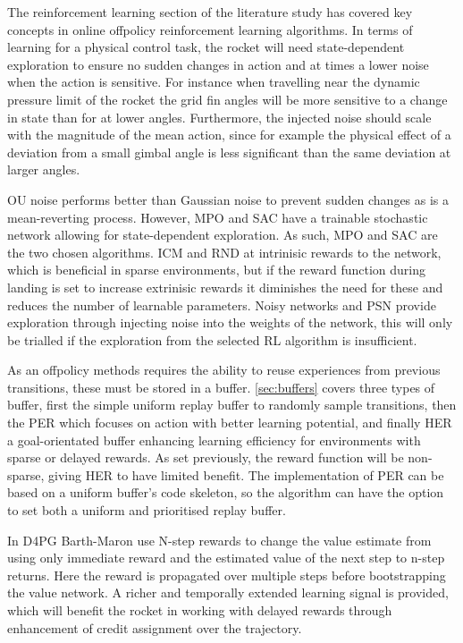 The reinforcement learning section of the literature study has covered key concepts in online offpolicy reinforcement learning algorithms. In terms of learning for a physical control task, the rocket will need state-dependent exploration to ensure no sudden changes in action and at times a lower noise when the action is sensitive. For instance when travelling near the dynamic pressure limit of the rocket the grid fin angles will be more sensitive to a change in state than for at lower angles. Furthermore, the injected noise should scale with the magnitude of the mean action, since for example the physical effect of a deviation from a small gimbal angle is less significant than the same deviation at larger angles.

OU noise performs better than Gaussian noise to prevent sudden changes as is a mean-reverting process. However, MPO and SAC have a trainable stochastic network allowing for state-dependent exploration. As such, MPO and SAC are the two chosen algorithms. ICM and RND at intrinisic rewards to the network, which is beneficial in sparse environments, but if the reward function during landing is set to increase extrinisic rewards it diminishes the need for these and reduces the number of learnable parameters. Noisy networks and PSN provide exploration through injecting noise into the weights of the network, this will only be trialled if the exploration from the selected RL algorithm is insufficient.

As an offpolicy methods requires the ability to reuse experiences from previous transitions, these must be stored in a buffer. \autoref{sec:buffers} covers three types of buffer, first the simple uniform replay buffer to randomly sample transitions, then the PER which focuses on action with better learning potential, and finally HER a goal-orientated buffer enhancing learning efficiency for environments with sparse or delayed rewards. As set previously, the reward function will be non-sparse, giving HER to have limited benefit. The implementation of PER can be based on a uniform buffer's code skeleton, so the algorithm can have the option to set both a uniform and prioritised replay buffer.

In D4PG Barth-Maron use N-step rewards to change the value estimate from using only immediate reward and the estimated value of the next step to n-step returns. Here the reward is propagated over multiple steps before bootstrapping the value network. A richer and temporally extended learning signal is provided, which will benefit the rocket in working with delayed rewards through enhancement of credit assignment over the trajectory.

